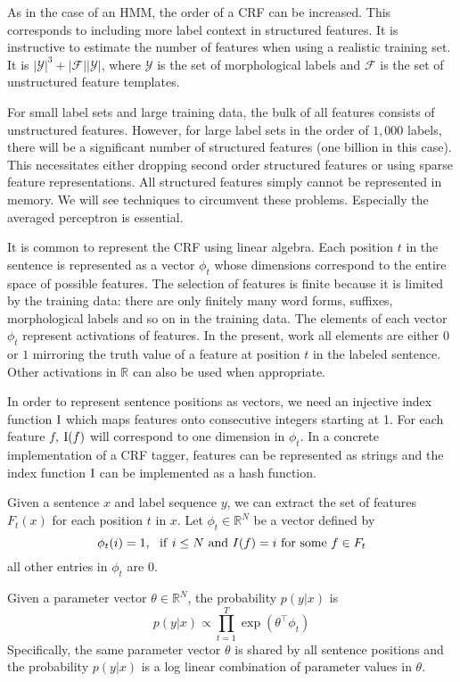 As in the case of an HMM, the order of a CRF can be increased. This
corresponds to including more label context in structured features. It
is instructive to estimate the number of features when using a
realistic training set. It is
$|\mathcal{Y}|^3 + |\mathcal{F}||\mathcal{Y}|$, where $\mathcal{Y}$ is
the set of morphological labels and $\mathcal{F}$ is the set of
unstructured feature templates.

For small label sets and large training data, the bulk of all features
consists of unstructured features. However, for large
label sets in the order of $1,000$ labels, there will be a significant
number of structured features (one billion in this case). This
necessitates either dropping second order structured features or using
sparse feature representations. All structured features simply cannot
be represented in memory. We will see techniques to circumvent these
problems. Especially the averaged perceptron is essential.

It is common to represent the CRF using linear algebra. Each position
$t$ in the sentence is represented as a vector $\phi_t$ whose
dimensions correspond to the entire space of possible features. The
selection of features is finite because it is limited by the training
data: there are only finitely many word forms, suffixes, morphological
labels and so on in the training data. The elements of each vector
$\phi_t$ represent activations of features. In the present, work all
elements are either $0$ or $1$ mirroring the truth value of a feature
at position $t$ in the labeled sentence. Other activations in
$\mathbb{R}$ can also be used when appropriate.

In order to represent sentence positions as vectors, we need an
injective index function ${\rm I}$ which maps features onto consecutive
integers starting at 1. For each feature $f$, ${\rm I}(f)$ will correspond
to one dimension in $\phi_t$. In a concrete implementation of a CRF
tagger, features can be represented as strings and the index function
${\rm I}$ can be implemented as a hash function.
 
Given a sentence $x$ and label sequence $y$, we can extract the set of features
$F_t(x)$ for each position $t$ in $x$. Let $\phi_t \in \mathbb{R}^N$ be a vector defined by
$$\phi_t(i) = 1,\ {\rm\ if}\ i \le N\ {\rm and}\ I(f) = i\ {\rm for\ some\ }f\in F_t$$
all other entries in $\phi_t$ are $0$. 

Given a parameter vector $\theta \in \mathbb{R}^N$, the probability $p(y|x)$ is
$$p(y|x) \propto \prod_{t = 1}^T \exp(\theta^\top \phi_t)$$
Specifically, the same parameter vector $\theta$ is shared by all
sentence positions and the probability $p(y|x)$ is a log linear
combination of parameter values in $\theta$.


